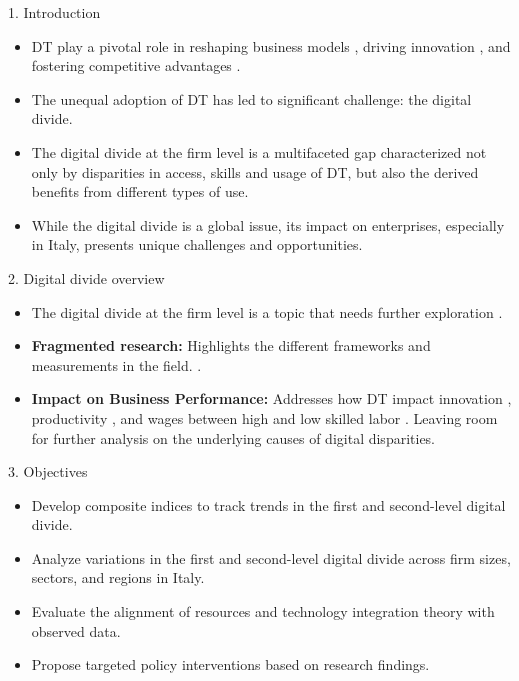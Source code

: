 \documentclass[
  ignorenonframetext,
]{beamer}
\begin{document}
\begin{frame}{1. Introduction}
\label{introduction}
\begin{itemize}
\item
  DT play a pivotal role in reshaping business models
  \citep{trischler2023} , driving innovation \citep{ciarli2021}, and
  fostering competitive advantages \citep{jeganjosephjerome2024}.
\item
  The unequal adoption of DT has led to significant challenge: the
  digital divide.
\item
  The digital divide at the firm level is a multifaceted gap
  characterized not only by disparities in access, skills and usage of
  DT, but also the derived benefits from different types of use.
\item
  While the digital divide is a global issue, its impact on enterprises,
  especially in Italy, presents unique challenges and opportunities.
\end{itemize}
\end{frame}

\begin{frame}{2. Digital divide overview}
\label{digital-divide-overview}
\begin{itemize}
\item
  The digital divide at the firm level is a topic that needs further
  exploration
  \citep{pejicbach2013, acilar2021, lythreatis2022, thonipara2023, shakina2021a, siqueira2019}.
\item
  \textbf{Fragmented research:} Highlights the different frameworks and
  measurements in the field.
  \citep{forman2002, vehovar2006, shakina2021a, acilar2021, ndulu2022}.
\item
  \textbf{Impact on Business Performance:} Addresses how DT impact
  innovation \citep{usai2021}, productivity \citep{cusolito2020}, and
  wages between high and low skilled labor \citep{vasilescu2020} .
  Leaving room for further analysis on the underlying causes of digital
  disparities.
\end{itemize}
\end{frame}

\begin{frame}{3. Objectives}
\label{objectives}
\begin{itemize}
\item
  Develop composite indices to track trends in the first and
  second-level digital divide.
\item
  Analyze variations in the first and second-level digital divide across
  firm sizes, sectors, and regions in Italy.
\item
  Evaluate the alignment of resources and technology integration theory
  with observed data.
\item
  Propose targeted policy interventions based on research findings.
\end{itemize}
\end{frame}
\end{document}
